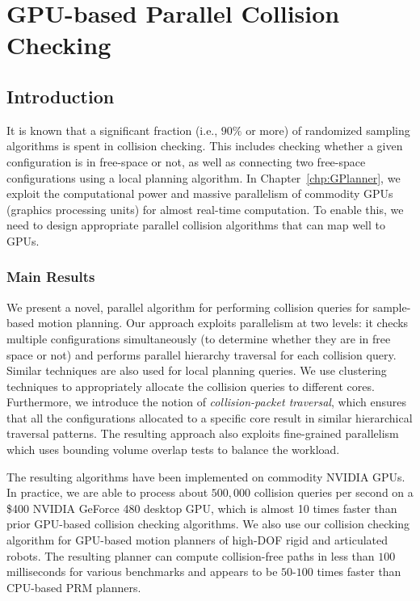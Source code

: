 \chapter{GPU-based Parallel Collision Checking} 
\label{chp:GCollide}


\section{Introduction}
It is known that a significant fraction (i.e., $90\%$ or more) of randomized sampling algorithms is
spent in collision checking. This includes checking whether a given configuration is in free-space or not,
as well as connecting two free-space configurations using a local planning algorithm. In Chapter~\ref{chp:GPlanner}, we exploit the computational power and massive parallelism of commodity GPUs (graphics processing units) for almost real-time
computation. To enable this, we need to design appropriate parallel collision algorithms that can map well to GPUs.

\subsection{Main Results}
We present a novel, parallel algorithm for performing collision queries for sample-based
motion planning. Our approach exploits parallelism at two levels: it checks multiple configurations simultaneously (to determine whether they are in free space or not) and performs parallel hierarchy traversal for each collision query.
Similar techniques are also used for local planning queries. We use clustering techniques to appropriately
allocate the collision queries to different cores. Furthermore, we introduce the notion of \emph{collision-packet traversal},
which ensures that all the configurations allocated to a specific core result in similar hierarchical traversal
patterns. The resulting approach also exploits fine-grained parallelism which uses bounding volume overlap tests
to balance the workload.

The resulting algorithms have been implemented on commodity NVIDIA GPUs. In practice, we are able to process about
$500,000$ collision queries per second on a \$400 NVIDIA GeForce 480 desktop GPU, which is almost 10 times faster than prior GPU-based collision checking algorithms. We also use our collision checking algorithm for GPU-based motion planners of high-DOF
rigid and articulated robots.
The resulting planner can compute collision-free paths in less than $100$ milliseconds for various benchmarks and
appears to be $50\text{-}100$ times faster than CPU-based PRM planners.

